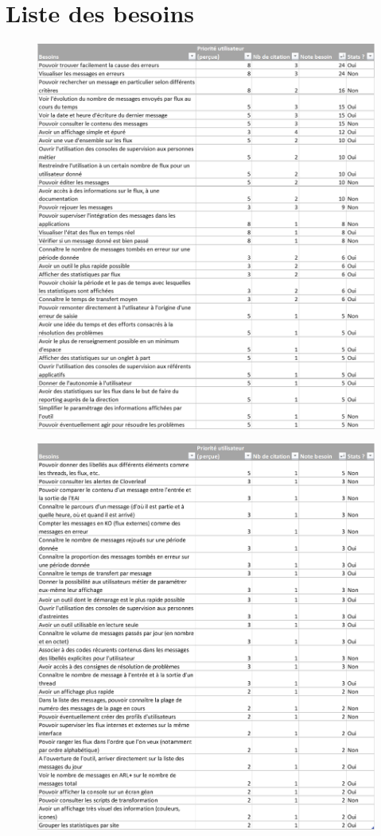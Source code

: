 \tocless\chapter{Liste des besoins}
	\begin{figure}[H]
		\centering
		\includegraphics[width=17cm]{../img/annexes/besoins_1.png}
	\end{figure}
	\begin{figure}[H]
		\centering
		\includegraphics[width=17cm]{../img/annexes/besoins_2.png}
	\end{figure}